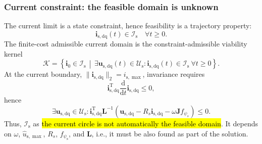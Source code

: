 \begin{frame}
	\frametitle{Current constraint: the feasible domain is unknown}
	The current limit is a state constraint, hence feasibility is a trajectory property:
	\begin{equation*}
		\bm{i}_{\mathrm{s,dq}}(t)\in\mathcal{I}_\mathrm{s}
		\quad \forall t\geq0.
	\end{equation*}\pause%
	The finite-cost admissible current domain is the constraint-admissible viability kernel
	\begin{equation*}
		\mathcal{K}=\left\{\bm{i}_0\in\mathcal{I}_\mathrm{s}\,\middle|\,
		\exists\bm{u}_{\mathrm{s,dq}}(t)\in\mathcal{U}_\mathrm{s}:
		\bm{i}_{\mathrm{s,dq}}(t)\in\mathcal{I}_\mathrm{s}\ \forall t\geq0\right\}.
	\end{equation*}\pause%
	At the current boundary, $\|\bm{i}_{\mathrm{s,dq}}\|_2=i_{\mathrm{s},\max}$, invariance requires
	\begin{equation*}
		\bm{i}_{\mathrm{s,dq}}^{\mathrm{T}}\frac{\mathrm{d}}{\mathrm{d}t}\bm{i}_{\mathrm{s,dq}}\leq0,
	\end{equation*}\pause%
	hence
	\begin{equation*}
		\exists\bm{u}_{\mathrm{s,dq}}\in\mathcal{U}_\mathrm{s}:
		\bm{i}_{\mathrm{s,dq}}^{\mathrm{T}}\bm{L}^{-1}
		\left(\bm{u}_{\mathrm{s,dq}}-R_s\bm{i}_{\mathrm{s,dq}}
		-\omega\bm{J}f_{\psi_s}\right)\leq0 .
	\end{equation*}\pause%
	Thus, $\mathcal{I}_\mathrm{s}$ as \hl{the current circle is not automatically the feasible domain}.
	It depends on $\omega$, $\hat{u}_{\mathrm{s},\max}$, $R_s$, $f_{\psi_\mathrm{s}}$, and $\bm{L}$, i.e., it must be also found as part of the solution.
\end{frame}

